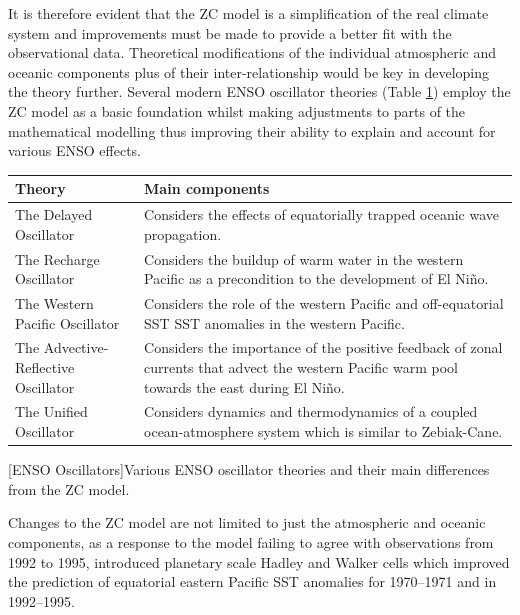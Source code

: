 \documentclass[12pt, onecolumn]{revtex4}    %
\begin{document}
It is therefore evident that the ZC model is a simplification of the real climate system and improvements must be made to provide a better fit with the observational data. Theoretical modifications of the individual atmospheric and oceanic components plus of their inter-relationship would be key in developing the theory further. Several modern ENSO oscillator theories (Table \ref{table:enso_oscillators}) employ the ZC model as a basic foundation whilst making adjustments to parts of the mathematical modelling thus improving their ability to explain and account for various ENSO effects.

\begin{table}[htbp]
\renewcommand{\arraystretch}{1.0}
\begin{tabular}{|p{7cm}|p{9cm}|}
 \hline
 \textbf{Theory} & \textbf{Main components} \\ [0.5ex] 
 \hline
 The Delayed Oscillator \citep{Suarez:1988aa, Battisti:1988aa} & Considers the effects of equatorially trapped oceanic wave propagation. \\
 \hline
 The Recharge Oscillator \citep{Jin:1997aa} & Considers the buildup of warm water in the western Pacific as a precondition to the development of El Ni\~{n}o. \\
 \hline
 The Western Pacific Oscillator \citep{Weisberg:1997aa, wang1999effects} & Considers the role of the western Pacific and off-equatorial SST SST anomalies in the western Pacific. \\
 \hline
 The Advective-Reflective Oscillator \citep{Picaut663} & Considers the importance of the positive feedback of zonal currents that advect the western Pacific warm pool towards the east during El Ni\~{n}o.  \\
 \hline
 The Unified Oscillator \citep{wang2001unified} & Considers dynamics and thermodynamics of a coupled ocean-atmosphere system which is similar to Zebiak-Cane. \\
 \hline
\end{tabular}
[ENSO Oscillators]{Various ENSO oscillator theories and their main differences from the ZC model.}
\label{table:enso_oscillators}
\end{table}

Changes to the ZC model are not limited to just the atmospheric and oceanic components, as a response to the model failing to agree with observations from 1992 to 1995, \cite{qian1997multiple} introduced planetary scale Hadley and Walker cells which improved the prediction of equatorial eastern Pacific SST anomalies for 1970--1971 and in 1992--1995. \\
\end{document}
